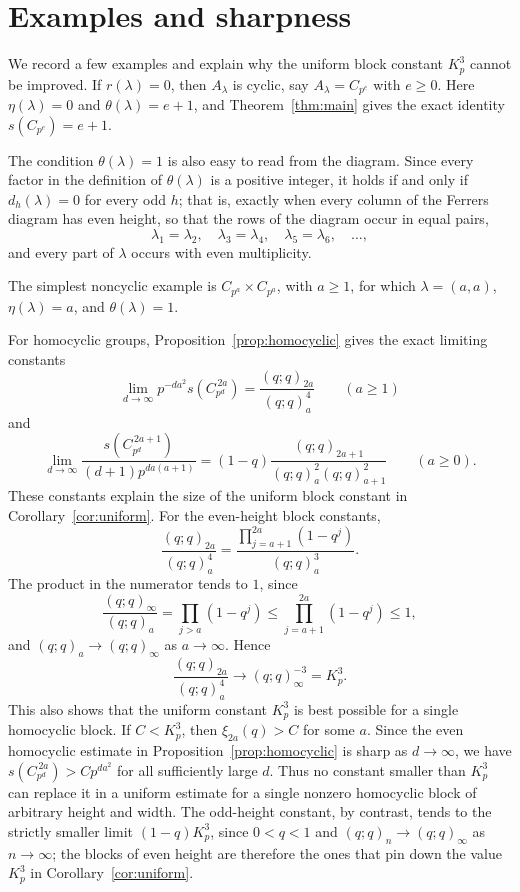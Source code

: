 \documentclass[a4paper,11pt,reqno]{amsart}
\theoremstyle{plain}
\theoremstyle{remark}
\numberwithin{equation}{section}
\renewcommand{\leq}{\leqslant}
\renewcommand{\geq}{\geqslant}
\begin{document}
\section{Examples and sharpness}
\label{sec:examples-sharpness}

We record a few examples and explain why the uniform block constant $K_p^3$
cannot be improved. If $r(\lambda)=0$, then $A_\lambda$ is cyclic, say
$A_\lambda=C_{p^e}$ with $e\geq 0$. Here $\eta(\lambda)=0$ and
$\theta(\lambda)=e+1$, and Theorem~\ref{thm:main} gives the exact identity
$s(C_{p^e})=e+1$.

The condition $\theta(\lambda)=1$ is also easy to read from the diagram.
Since every factor in the definition of $\theta(\lambda)$ is a positive
integer, it holds if and only if $d_h(\lambda)=0$ for every odd $h$; that is,
exactly when every column of the Ferrers diagram has even height, so that the
rows of the diagram occur in equal pairs,
\[
        \lambda_1=\lambda_2,
        \quad
        \lambda_3=\lambda_4,
        \quad
        \lambda_5=\lambda_6,
        \quad\ldots ,
\]
and every part of $\lambda$ occurs with even multiplicity. 

The simplest noncyclic example is $C_{p^a}\times C_{p^a}$, with $a\geq 1$, 
for which $\lambda=(a,a)$, $\eta(\lambda)=a$, and $\theta(\lambda)=1$.

For homocyclic groups, Proposition~\ref{prop:homocyclic} gives the exact
limiting constants
\[
        \lim_{d\to\infty}p^{-da^2}s(C_{p^d}^{\,2a})
        =
        \frac{(q;q)_{2a}}{(q;q)_a^4}
        \qquad (a\geq 1)
\]
and
\[
        \lim_{d\to\infty}
        \frac{s(C_{p^d}^{\,2a+1})}{(d+1)p^{da(a+1)}}
        =
        (1-q)\frac{(q;q)_{2a+1}}{(q;q)_a^2(q;q)_{a+1}^2}
        \qquad (a\geq 0).
\]
These constants explain the size of the uniform block constant in
Corollary~\ref{cor:uniform}.
For the even-height block constants,
\[
        \frac{(q;q)_{2a}}{(q;q)_a^4}
        =
        \frac{\prod_{j=a+1}^{2a}(1-q^j)}{(q;q)_a^3}.
\]
The product in the numerator tends to $1$, since
\[
        \frac{(q;q)_\infty}{(q;q)_a}
        =
        \prod_{j>a}(1-q^j)
        \leq
        \prod_{j=a+1}^{2a}(1-q^j)
        \leq 1,
\]
and $(q;q)_a\to(q;q)_\infty$ as $a\to\infty$. Hence
\[
        \frac{(q;q)_{2a}}{(q;q)_a^4}
        \longrightarrow
        (q;q)_\infty^{-3}=K_p^3.
\]
This also shows that the uniform constant $K_p^3$ is best possible for a
single homocyclic block. 
If $C<K_p^3$, then $\xi_{2a}(q)>C$ for some $a$. 
Since the even homocyclic estimate in Proposition~\ref{prop:homocyclic} 
is sharp as $d\to\infty$, we have $s(C_{p^d}^{\,2a})>C p^{da^2}$ for all sufficiently large $d$. 
Thus no constant smaller than $K_p^3$ can replace it in a uniform estimate for a
single nonzero homocyclic block of arbitrary height and width. 
The odd-height constant, by contrast, tends to the strictly smaller limit
$(1-q)K_p^3$, since $0<q<1$ and $(q;q)_n\to(q;q)_\infty$ as $n\to\infty$; 
the blocks of even height are therefore the ones that pin down 
the value $K_p^3$ in Corollary~\ref{cor:uniform}.
\end{document}
